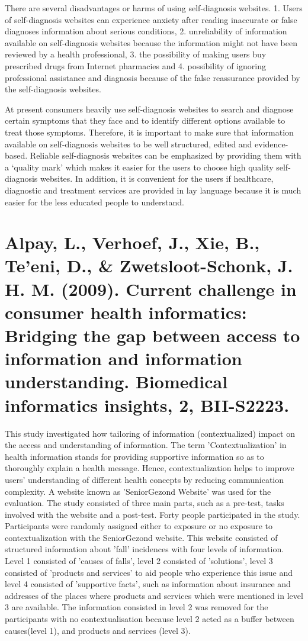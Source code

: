 \documentclass[]{article}
\begin{document}
There are several disadvantages or harms of using self-diagnosis websites. 1. Users of self-diagnosis websites can experience anxiety after reading inaccurate or false diagnoses information about serious conditions, 2. unreliability of information available on self-diagnosis websites because the information might not have been reviewed by a health professional, 3. the possibility of making users buy prescribed drugs from Internet pharmacies and 4. possibility of ignoring professional assistance and diagnosis because of the false reassurance provided by the self-diagnosis websites.        

At present consumers heavily use self-diagnosis websites to search and diagnose certain symptoms that they face and to identify different options available to treat those symptoms. Therefore, it is important to make sure that information available on self-diagnosis websites to be well structured, edited and evidence-based. Reliable self-diagnosis websites can be emphasized by providing them with a ‘quality mark’ which makes it easier for the users to choose high quality self-diagnosis websites. In addition, it is convenient for the users if healthcare, diagnostic and treatment services are provided in lay language because it is much easier for the less educated people to understand.       

\section{Alpay, L., Verhoef, J., Xie, B., Te'eni, D., \& Zwetsloot-Schonk, J. H. M. (2009). Current challenge in consumer health informatics: Bridging the gap between access to information and information understanding. Biomedical informatics insights, 2, BII-S2223.}

This study investigated how tailoring of information (contextualized) impact on the access and understanding of information. The term 'Contextualization' in health information stands for providing supportive information so as to thoroughly explain a health message. Hence, contextualization helps to improve users' understanding of different health concepts by reducing communication complexity. A website known as 'SeniorGezond Website' was used for the evaluation. The study consisted of three main parts, such as a pre-test, tasks involved with the website and a post-test. Forty people participated in the study. Participants were randomly assigned either to exposure or no exposure to contextualization with the SeniorGezond website. This website consisted of structured information about 'fall' incidences with four levels of information. Level 1 consisted of 'causes of falls', level 2 consisted of 'solutions', level 3 consisted of 'products and services' to aid people who experience this issue and level 4 consisted of 'supportive facts', such as information about insurance and addresses of the places where products and services which were mentioned in level 3 are available. The information consisted in level 2 was removed for the participants with no contextualisation because level 2 acted as a buffer between causes(level 1), and products and services (level 3).
\end{document}
